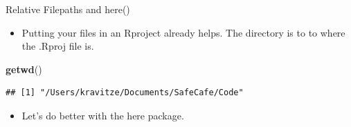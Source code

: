 \documentclass[ignorenonframetext,]{beamer}
\newenvironment{Shaded}{\begin{snugshade}}{\end{snugshade}}
\newcommand{\KeywordTok}[1]{\textcolor[rgb]{0.13,0.29,0.53}{\textbf{#1}}}
\newcommand{\NormalTok}[1]{#1}
\providecommand{\tightlist}{%
  \setlength{\itemsep}{0pt}\setlength{\parskip}{0pt}}
\begin{document}
\begin{frame}[fragile]{Relative Filepaths and here()}
\protect\hypertarget{relative-filepaths-and-here-1}{}

\begin{itemize}
\tightlist
\item
  Putting your files in an Rproject already helps. The directory is to
  to where the .Rproj file is.
\end{itemize}

\begin{Shaded}
\begin{Highlighting}[]
\KeywordTok{getwd}\NormalTok{()}
\end{Highlighting}
\end{Shaded}

\begin{verbatim}
## [1] "/Users/kravitze/Documents/SafeCafe/Code"
\end{verbatim}

\begin{itemize}
\tightlist
\item
  Let’s do better with the here package.
\end{itemize}

\end{frame}
\end{document}
